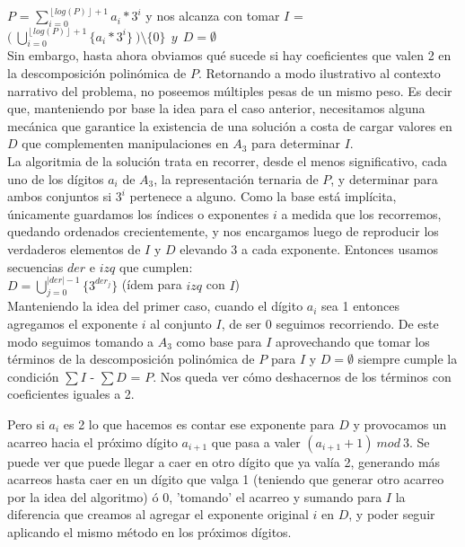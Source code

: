 	$P$ = $\sum_{i = 0}^{\left \lfloor{log(P)}\right \rfloor + 1} a_i*3^{i}$ y nos alcanza con tomar $I$ = $\bigl ( \ \bigcup_{i=0}^{\left \lfloor{log(P)}\right \rfloor + 1} \{a_i*3^{i}\} \ \bigr ) \setminus \{0\} \ \ y \ \ D = \emptyset $
	\\

	Sin embargo, hasta ahora obviamos qué sucede si hay coeficientes que valen 2 en la descomposición polinómica de $P$. Retornando a modo ilustrativo al contexto narrativo del problema, no poseemos múltiples pesas de un mismo peso. Es decir que, manteniendo por base la idea para el caso anterior, necesitamos alguna mecánica que garantice la existencia de una solución a costa de cargar valores en $D$ que complementen manipulaciones en $A_3$ para determinar $I$.
	\\

	La algoritmia de la solución trata en recorrer, desde el menos significativo, cada uno de los dígitos $a_i$ de $A_3$, la representación ternaria de $P$, y determinar para ambos conjuntos si $3^{i}$ pertenece a alguno. Como la base está implícita, únicamente guardamos los índices o exponentes $i$ a medida que los recorremos, quedando ordenados crecientemente, y nos encargamos luego de reproducir los verdaderos elementos de $I$ y $D$ elevando 3 a cada exponente. Entonces usamos secuencias $der$ e $izq$ que cumplen:
	\\

	$D = \bigcup_{j=0}^{|der|-1} \{3^{der_{j}}\}  $   \quad (ídem para $izq$ con $I$)
	\\

	Manteniendo la idea del primer caso, cuando el dígito $a_i$ sea 1 entonces agregamos el exponente $i$ al conjunto $I$, de ser 0 seguimos recorriendo. De este modo seguimos tomando a $A_3$ como base para $I$ aprovechando que tomar los términos de la descomposición polinómica de $P$ para $I$ y $D = \emptyset$ siempre cumple la condición $\sum I$ - $\sum D$ = $P$. Nos queda ver cómo deshacernos de los términos con coeficientes iguales a 2.

	Pero si $a_i$ es 2 lo que hacemos es contar ese exponente para $D$ y provocamos un acarreo hacia el próximo dígito $a_{i+1}$ que pasa a valer $(a_{i+1} + 1) \ mod \ 3$. Se puede ver que puede llegar a caer en otro dígito que ya valía 2, generando más acarreos hasta caer en un dígito que valga 1 (teniendo que generar otro acarreo por la idea del algoritmo) ó 0, 'tomando' el acarreo y sumando para $I$ la diferencia que creamos al agregar el exponente original $i$ en $D$, y poder seguir aplicando el mismo método en los próximos dígitos.

